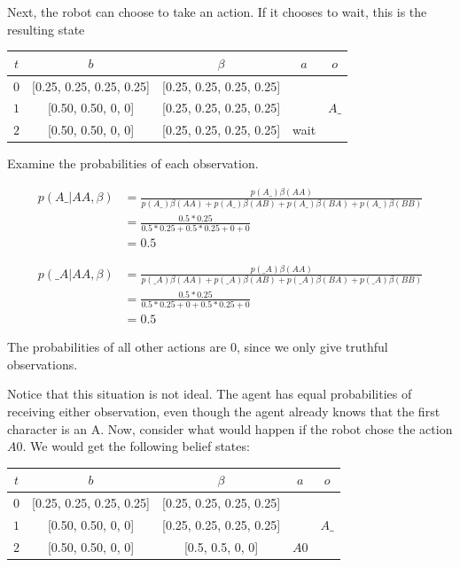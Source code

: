 \documentclass{article}
\begin{document}
Next, the robot can choose to take an action. If it chooses to wait, this is the resulting state


\begin{center}
\begin{tabular}{|c| c| c| c | c|}
	\hline
	$t$ & $b$ & $\beta$ & $a$ & $o$ \\
	\hline
	$0$ & [0.25, 0.25, 0.25, 0.25] & [0.25, 0.25, 0.25, 0.25] & & \\
	\hline
	$1$ & [0.50, 0.50, 0, 0] & [0.25, 0.25, 0.25, 0.25] & & $A\_$ \\
	\hline
	$2$ & [0.50, 0.50, 0, 0] & [0.25, 0.25, 0.25, 0.25] & wait  &  \\
	\hline
\end{tabular}
\end{center}

Examine the probabilities of each observation.

\begin{align*}
	p(A\_ | AA, \beta) &= \frac{ p(A\_)\beta(AA) }{ p(A\_)\beta(AA) + p(A\_)\beta(AB) + p(A\_)\beta(BA) + p(A\_)\beta(BB)} \\
	&= \frac{0.5 * 0.25}{0.5 * 0.25 + 0.5 * 0.25 + 0 + 0} \\
	&= 0.5
\end{align*}

\begin{align*}
	p(\_A | AA, \beta) &= \frac{ p(\_A)\beta(AA) }{ p(\_A)\beta(AA) + p(\_A)\beta(AB) + p(\_A)\beta(BA) + p(\_A)\beta(BB)} \\
	&= \frac{0.5 * 0.25}{0.5 * 0.25 + 0 + 0.5 * 0.25 + 0} \\
	&= 0.5
\end{align*}

The probabilities of all other actions are 0, since we only give truthful observations.

Notice that this situation is not ideal. The agent has equal probabilities of receiving either observation, even though the agent already knows that the first character is an A. Now, consider what would happen if the robot chose the action $A0$. We would get the following belief states: 


\begin{center}
\begin{tabular}{|c| c| c| c | c|}
	\hline
	$t$ & $b$ & $\beta$ & $a$ & $o$ \\
	\hline
	$0$ & [0.25, 0.25, 0.25, 0.25] & [0.25, 0.25, 0.25, 0.25] & & \\
	\hline
	$1$ & [0.50, 0.50, 0, 0] & [0.25, 0.25, 0.25, 0.25] & & $A\_$ \\
	\hline
	$2$ & [0.50, 0.50, 0, 0] & [0.5, 0.5, 0, 0] & $A0$  &  \\
	\hline
\end{tabular}
\end{center}
\end{document}
